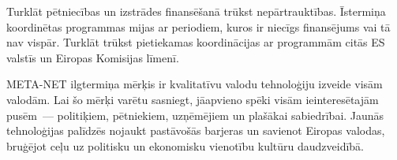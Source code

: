 \begin{multicols}{2}
Turklāt pētniecības un izstrādes finansēšanā trūkst nepārtrauktības.
Īstermiņa koordinētas programmas mijas ar periodiem, kuros ir niecīgs finansējums vai tā nav vispār.
Turklāt trūkst pietiekamas koordinācijas ar programmām citās ES valstīs un Eiropas Komisijas līmenī.

META-NET ilgtermiņa mērķis ir kvalitatīvu valodu tehnoloģiju izveide visām valodām.
Lai šo mērķi varētu sasniegt, jāapvieno spēki visām ieinteresētajām pusēm~--- politiķiem, pētniekiem, uzņēmējiem un plašākai sabiedrībai.
Jaunās tehnoloģijas palīdzēs nojaukt pastāvošās barjeras un savienot Eiropas valodas, bruģējot ceļu uz politisku un ekonomisku vienotību kultūru daudzveidībā.
\end{multicols}

\cleardoublepage



